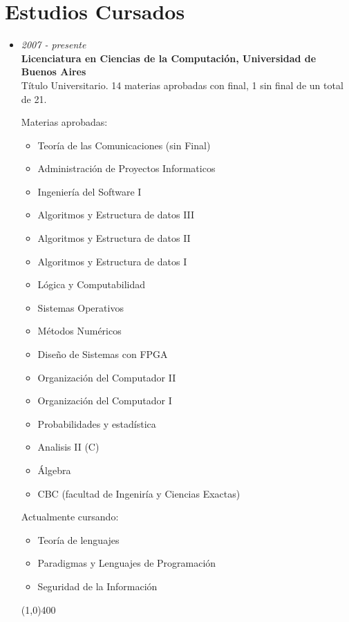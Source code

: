 \section{Estudios Cursados}

\begin{itemize}
\item \begin{large}\textit{2007 - presente}\\
	   \textbf{Licenciatura en Ciencias de la Computación, Universidad de Buenos Aires}\\
	  Título Universitario. 14 materias aprobadas con final, 1 sin final de un total de 21.\\
	  \end{large}
	Materias aprobadas:
	\begin{itemize}
	\item Teoría de las Comunicaciones (sin Final)
	\item Administración de Proyectos Informaticos
	\item Ingeniería del Software I
	\item Algoritmos y Estructura de datos III
	\item Algoritmos y Estructura de datos II
	\item Algoritmos y Estructura de datos I
	\item Lógica y Computabilidad
	\item Sistemas Operativos
	\item Métodos Numéricos
	\item Diseño de Sistemas con FPGA
	\item Organización del Computador II
	\item Organización del Computador I
	\item Probabilidades y estadística
	\item Analisis II (C)
	\item Álgebra
	\item CBC (facultad de Ingeniría y Ciencias Exactas)
	\end{itemize}

\noindent Actualmente cursando:
  \begin{itemize}
  \item Teoría de lenguajes
  \item Paradigmas y Lenguajes de Programación
  \item Seguridad de la Información
  \end{itemize}	 

\begin{center}
\line(1,0){400}
\end{center}


\end{itemize}
